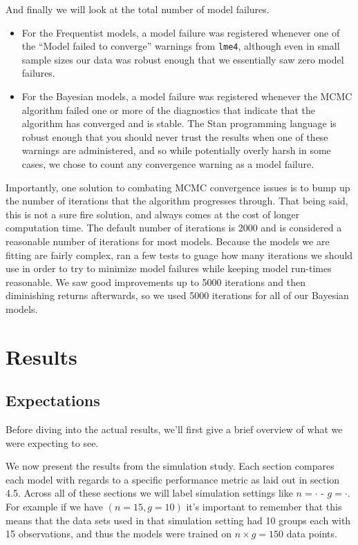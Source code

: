 \documentclass[12pt,twoside]{reedthesis}
\providecommand{\tightlist}{%
  \setlength{\itemsep}{0pt}\setlength{\parskip}{0pt}}
\begin{document}
And finally we will look at the total number of model failures.
\begin{itemize}
\tightlist
\item
  For the Frequentist models, a model failure was registered whenever one of the ``Model failed to converge'' warnings from \texttt{lme4}, although even in small sample sizes our data was robust enough that we essentially saw zero model failures.
\item
  For the Bayesian models, a model failure was registered whenever the MCMC algorithm failed one or more of the diagnostics that indicate that the algorithm has converged and is stable. The Stan programming language is robust enough that you should never trust the results when one of these warnings are administered, and so while potentially overly harsh in some cases, we chose to count any convergence warning as a model failure.
\end{itemize}
Importantly, one solution to combating MCMC convergence issues is to bump up the number of iterations that the algorithm progresses through. That being said, this is not a sure fire solution, and always comes at the cost of longer computation time. The default number of iterations is 2000 and is considered a reasonable number of iterations for most models. Because the models we are fitting are fairly complex, ran a few tests to guage how many iterations we should use in order to try to minimize model failures while keeping model run-times reasonable. We saw good improvements up to 5000 iterations and then diminishing returns afterwards, so we used 5000 iterations for all of our Bayesian models.

\hypertarget{res-sec}{%
\chapter{Results}\label{res-sec}}

\hypertarget{expectations}{%
\section{Expectations}\label{expectations}}

Before diving into the actual results, we'll first give a brief overview of what we were expecting to see.

We now present the results from the simulation study. Each section compares each model with regards to a specific performance metric as laid out in section 4.5. Across all of these sections we will label simulation settings like \(n = \cdot\) - \(g = \cdot\). For example if we have \((n = 15, g = 10 )\) it's important to remember that this means that the data sets used in that simulation setting had 10 groups each with 15 observations, and thus the models were trained on \(n\times g = 150\) data points.
\end{document}
